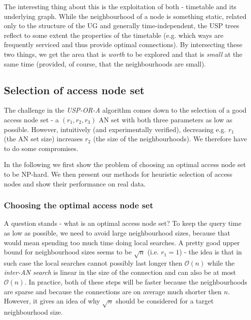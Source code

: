 		\noindent The interesting thing about this is the exploitation of both - timetable and its underlying graph. While the neighbourhood of a node is something static, related only to the structure of the UG and generally time-independent, the USP trees reflect to some extent the properties of the timetable (e.g. which ways are frequently serviced and thus provide optimal connections). By intersecting these two things, we get the area that is \textit{worth} to be explored and that is \textit{small} at the same time (provided, of course, that the neighbourhoods are small).	    
	 
\subsection{Selection of access node set}
	
	The challenge in the \textit{USP-OR-A} algorithm comes down to the selection of a good access node set - a $(r_{1}, r_{2}, r_{3})$ AN set with both three parameters as low as possible. However, intuitively (and experimentally verified), decreasing e.g. $r_{1}$ (the AN set size) increases $r_{2}$ (the size of the neighbourhoods). We therefore have to do some compromises.
	
	In the following we first show the problem of choosing an optimal access node set to be NP-hard. We then present our methods for heuristic selection of access nodes and show their performance on real data.
	    
	\subsubsection{Choosing the optimal access node set}

		A question stands - what is an optimal access node set?	To keep the query time as low as possible, we need to avoid large neighbourhood sizes, because that would mean spending too much time doing local searches. A pretty good upper bound for neighbourhood sizes seems to be $\sqrt{n}$ (i.e. $r_{1} = 1$) - the idea is that in such case the local searches cannot possibly last longer then $\mathcal{O}(n)$ while the \textit{inter-AN search} is linear in the size of the connection and can also be at most $\mathcal{O}(n)$. In practice, both of these steps will be faster because the neighbourhoods are sparse and because the connections are on average much shorter then $n$. However, it gives an idea of why $\sqrt{n}$ should be considered for a target neighbourhood size.
		
